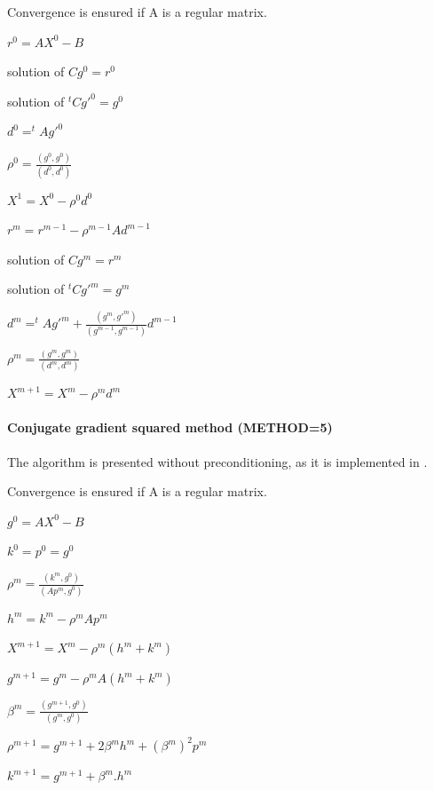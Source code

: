 Convergence is ensured if A is a regular matrix.


$r^{0}  =  A X^{0} - B$

solution of $Cg^{0}  =  r^{0}$

solution of $ ^{t}Cg'^{0}  =  g^{0}$

$d^{0}  =  ^{t}A g'^{0}$

$\rho ^{0} = \frac{(g^{0},g^{0})}{(d^{0},d^{0})}$

$X^{1}  =  X^{0}  -  \rho ^{0} d^{0}$


$r^{m}  =  r^{m-1}  -  \rho ^{m-1} A d^{m-1}$

solution of $Cg^{m}  =  r^{m}$

solution of $ ^{t}Cg'^{m}  =  g^{m}$

$d^{m} =  ^{t}Ag'^{m}
        + \frac{(g^{m},g'^{m})}
               {(g^{m-1},g^{m-1})} d^{m-1}$

$\rho ^{m} = \frac{(g^{m},g^{m})}{(d^{m},d^{m})}$

$X^{m+1} =  X^{m}  -  \rho ^{m} d^{m}$

\paragraph{Conjugate gradient squared method (METHOD=5)}

The algorithm is presented without preconditioning, as it is implemented in
\bief.

Convergence is ensured if A is a regular matrix.


$g^{0}  =  A X^{0} - B$

$k^{0}  =  p^{0}  =  g^{0}$


$\rho ^{m} = \frac{(k^{m},g^{0})}{(Ap^{m},g^{0})}$

$h^{m}  =  k^{m}  -  \rho ^{m} A p^{m}$

$X^{m+1} =  X^{m}  -  \rho ^{m} (h^{m}  +  k^{m})$

$g^{m+1} =  g^{m}  -  \rho ^{m} A (h^{m}  +  k^{m})$

$\beta ^{m} = \frac{(g^{m+1},g^{0})}{(g^{m},g^{0})}$

$\rho ^{m+1} = g^{m+1} + 2\beta^{m}h^{m}+ (\beta ^{m})^{2}p^{m}$

$k^{m+1}  =  g^{m+1}  +  \beta ^{m}.h^{m}$


